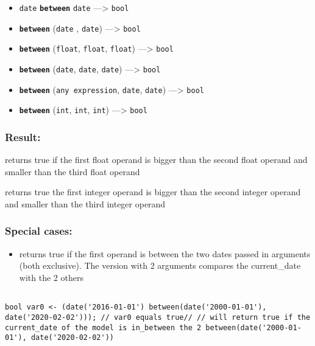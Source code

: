 \documentclass[]{book}
\providecommand{\tightlist}{%
  \setlength{\itemsep}{0pt}\setlength{\parskip}{0pt}}
\theoremstyle{definition}
\theoremstyle{definition}
\theoremstyle{definition}
\theoremstyle{remark}
\begin{document}
\begin{itemize}
\tightlist
\item
  \texttt{date} \textbf{\texttt{between}} \texttt{date}
  ---\textgreater{} \texttt{bool}
\item
  \textbf{\texttt{between}} (\texttt{date} , \texttt{date})
  ---\textgreater{} \texttt{bool}
\item
  \textbf{\texttt{between}} (\texttt{float}, \texttt{float},
  \texttt{float}) ---\textgreater{} \texttt{bool}
\item
  \textbf{\texttt{between}} (\texttt{date}, \texttt{date},
  \texttt{date}) ---\textgreater{} \texttt{bool}
\item
  \textbf{\texttt{between}} (\texttt{any\ expression}, \texttt{date},
  \texttt{date}) ---\textgreater{} \texttt{bool}
\item
  \textbf{\texttt{between}} (\texttt{int}, \texttt{int}, \texttt{int})
  ---\textgreater{} \texttt{bool}
\end{itemize}

\subsubsection{Result:}\label{result-66}

returns true if the first float operand is bigger than the second float
operand and smaller than the third float operand

returns true the first integer operand is bigger than the second integer
operand and smaller than the third integer operand

\subsubsection{Special cases:}\label{special-cases-24}

\begin{itemize}
\tightlist
\item
  returns true if the first operand is between the two dates passed in
  arguments (both exclusive). The version with 2 arguments compares the
  current\_date with the 2 others
\end{itemize}

\begin{verbatim}
 
bool var0 <- (date('2016-01-01') between(date('2000-01-01'), date('2020-02-02'))); // var0 equals true// // will return true if the current_date of the model is in_between the 2 between(date('2000-01-01'), date('2020-02-02')) 
\end{verbatim}
\end{document}
